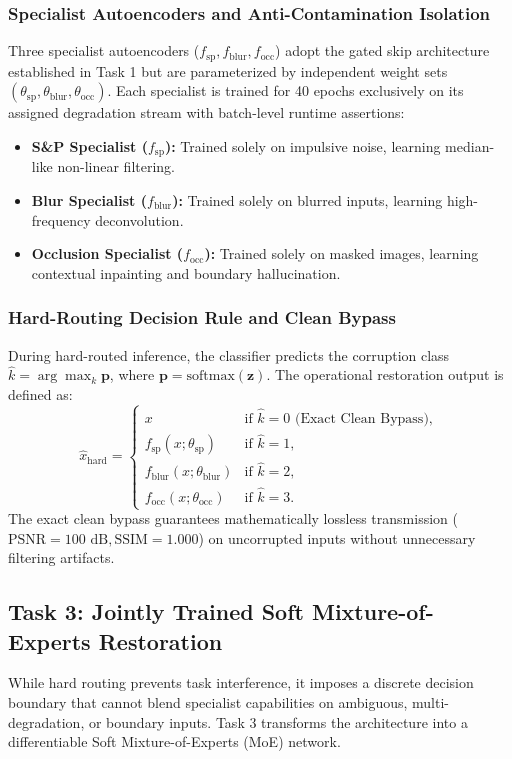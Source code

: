 \documentclass[conference]{IEEEtran}
\begin{document}
\subsubsection{Specialist Autoencoders and Anti-Contamination Isolation}
Three specialist autoencoders ($f_{\text{sp}}, f_{\text{blur}}, f_{\text{occ}}$) adopt the gated skip architecture established in Task 1 but are parameterized by independent weight sets $(\theta_{\text{sp}}, \theta_{\text{blur}}, \theta_{\text{occ}})$. Each specialist is trained for 40 epochs exclusively on its assigned degradation stream with batch-level runtime assertions:
\begin{itemize}
    \item \textbf{S\&P Specialist ($f_{\text{sp}}$):} Trained solely on impulsive noise, learning median-like non-linear filtering.
    \item \textbf{Blur Specialist ($f_{\text{blur}}$):} Trained solely on blurred inputs, learning high-frequency deconvolution.
    \item \textbf{Occlusion Specialist ($f_{\text{occ}}$):} Trained solely on masked images, learning contextual inpainting and boundary hallucination.
\end{itemize}

\subsubsection{Hard-Routing Decision Rule and Clean Bypass}
During hard-routed inference, the classifier predicts the corruption class $\hat{k} = \arg\max_{k} \mathbf{p}$, where $\mathbf{p} = \text{softmax}(\mathbf{z})$. The operational restoration output is defined as:
\begin{equation}
\hat{x}_{\text{hard}} = \begin{cases} 
x & \text{if } \hat{k} = 0 \text{ (Exact Clean Bypass)}, \\
f_{\text{sp}}(x; \theta_{\text{sp}}) & \text{if } \hat{k} = 1, \\
f_{\text{blur}}(x; \theta_{\text{blur}}) & \text{if } \hat{k} = 2, \\
f_{\text{occ}}(x; \theta_{\text{occ}}) & \text{if } \hat{k} = 3.
\end{cases}
\end{equation}
The exact clean bypass guarantees mathematically lossless transmission ($\text{PSNR} = 100\text{ dB}, \text{SSIM} = 1.000$) on uncorrupted inputs without unnecessary filtering artifacts.

\subsection{Task 3: Jointly Trained Soft Mixture-of-Experts Restoration}
While hard routing prevents task interference, it imposes a discrete decision boundary that cannot blend specialist capabilities on ambiguous, multi-degradation, or boundary inputs. Task 3 transforms the architecture into a differentiable Soft Mixture-of-Experts (MoE) network.
\end{document}
